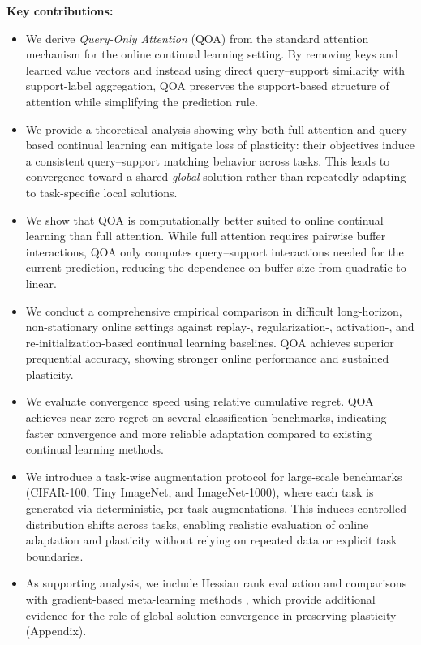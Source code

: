 \documentclass{article}
\begin{document}
\textbf{Key contributions:}
\begin{itemize}
\item We derive \textit{Query-Only Attention} (QOA) from the standard attention mechanism  \citep{vaswani2017attention} for the online continual learning setting. By removing keys and learned value vectors and instead using direct query--support similarity with support-label aggregation, QOA preserves the support-based structure of attention while simplifying the prediction rule.

\item We provide a theoretical analysis showing why both full attention and query-based continual learning can mitigate loss of plasticity: their objectives induce a consistent query--support matching behavior across tasks. This leads to convergence toward a shared \textit{global} solution rather than repeatedly adapting to task-specific local solutions.

\item We show that QOA is computationally better suited to online continual learning than full attention. While full attention requires pairwise buffer interactions, QOA only computes query--support interactions needed for the current prediction, reducing the dependence on buffer size from quadratic to linear.

\item We conduct a comprehensive empirical comparison in difficult long-horizon, non-stationary online settings against replay-, regularization-, activation-, and re-initialization-based continual learning baselines. QOA achieves superior prequential accuracy, showing stronger online performance and sustained plasticity.

\item We evaluate convergence speed using relative cumulative regret. QOA achieves near-zero regret on several classification benchmarks, indicating faster convergence and more reliable adaptation compared to existing continual learning methods.

\item We introduce a task-wise augmentation protocol for large-scale benchmarks (CIFAR-100, Tiny ImageNet, and ImageNet-1000), where each task is generated via deterministic, per-task augmentations. This induces controlled distribution shifts across tasks, enabling realistic evaluation of online adaptation and plasticity without relying on repeated data or explicit task boundaries.

\item As supporting analysis, we include Hessian rank evaluation \citep{lewandowski2023curvature} and comparisons with gradient-based meta-learning methods \citep{finn2017maml}, which provide additional evidence for the role of global solution convergence in preserving plasticity (Appendix).

\end{itemize}
\end{document}
